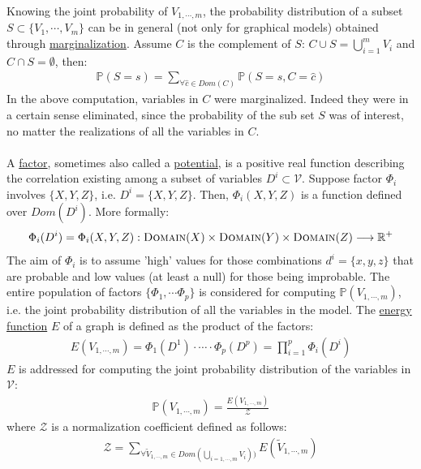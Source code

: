 Knowing the joint probability of $V_{1,\cdots,m}$, the probability distribution of a subset $S \subset \lbrace V_1,\cdots,V_m \rbrace$ can be in general (not only for graphical models) obtained through \underline{marginalization}. Assume $C$ is the complement of $S$: $C \cup S = \bigcup_{i=1}^{m} V_i$ and $C \cap S = \emptyset$, then:
\begin{eqnarray}
\mathbb{P}(S=s) = \sum _{ \forall \hat{c} \in  Dom(C)} \mathbb{P}(S=s, C=\hat{c})
\label{eq:00:marginalization}
\end{eqnarray}
In the above computation, variables in $C$ were marginalized. Indeed they were in a certain sense eliminated, since the probability of the sub set $S$ was of interest, no matter the realizations of all the variables in $C$.
\\
\\
A \underline{factor}, sometimes also called a \underline{potential}, is a positive real function describing the correlation existing among a subset of variables $D^i \subset \mathcal{V}$. Suppose factor $\Phi _i$ involves $\lbrace {X}, {Y}, {Z} \rbrace$, i.e. $D^i = \lbrace {X}, {Y}, {Z} \rbrace$. Then, $\Phi _i({X}, {Y}, {Z})$ is a function defined over $Dom(D^i)$. More formally:
\begin{eqnarray}
\Phi _i(D^i) = 
\Phi _i(X,Y,Z) : \textsc{Domain}({X}) \times \textsc{Domain}({Y}) \times \textsc{Domain}({Z})  \longrightarrow \mathbb{R}^{+}
\end{eqnarray}
The aim of $\Phi _i$ is to assume 'high' values for those combinations $d^i = \lbrace x , y, z \rbrace$ that are probable and low values (at least a null) for those being improbable.
The entire population of factors $\lbrace \Phi _1, \cdots \Phi _p \rbrace$ is considered for computing $\mathbb{P}({V}_{1,\cdots,m})$, i.e. the joint probability distribution of all the variables in the model. The \underline{energy function} $E$ of a graph is defined as the product of the factors:
\begin{eqnarray}
E({V}_{1,\cdots,m}) = \Phi _1 ( D^1 ) \cdot \cdots \cdot  \Phi _p ( D^p )=  \prod_{i = 1} ^{p} \Phi _i ( D^i ) 
\label{eq:00:energy}
\end{eqnarray}
$E$ is addressed for computing the joint probability distribution of the variables in $\mathcal{V}$:
\begin{eqnarray}
\mathbb{P}({V}_{1,\cdots,m}) =  \frac{ E({V}_{1,\cdots,m}) }{\mathcal{Z}}
\label{eq:00::joint_prob}
\end{eqnarray} 
where $\mathcal{Z}$ is a normalization coefficient defined as follows:
\begin{eqnarray}
\mathcal{Z} = \sum _{\forall \tilde{V}_{1,\cdots,m} \in 
Dom(\bigcup_{i=1,\cdots,m} V_i))} E( \tilde{V}_{1,\cdots,m} )
\end{eqnarray}

